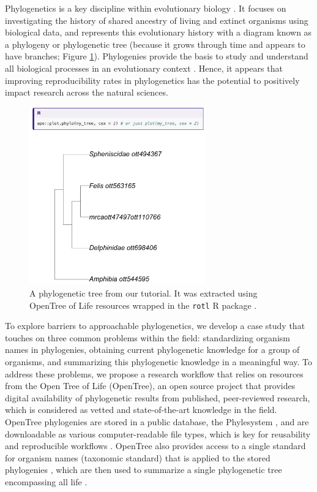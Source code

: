 \documentclass[12pt]{article}
\begin{document}
Phylogenetics is a key discipline within evolutionary biology \citep{dobzhansky1973nothing}.
It focuses on investigating the history of shared ancestry of living and extinct
organisms using biological data,
and represents this evolutionary history with a diagram known as a phylogeny
or phylogenetic tree (because it grows through time and appears to have branches;
Figure \ref{fig:tree}).
Phylogenies provide the basis to study and understand all biological processes
in an evolutionary context \citep{dobzhansky1973nothing}.
Hence, it appears that improving reproducibility rates in phylogenetics has the
potential to positively impact research across the natural sciences.

\begin{figure}
\begin{center}
\includegraphics[width=3in]{fig-tree.png}
\end{center}
\caption{A phylogenetic tree from our tutorial. It was extracted using OpenTree of Life resources \citep{opentreeoflife2019synth} wrapped in the \texttt{rotl} R package \citep{michonneau2016rotl}. \label{fig:tree}}
\end{figure}

To explore barriers to approachable phylogenetics, we develop a case study
that touches on three common problems within the field: standardizing
organism names in phylogenies, obtaining current phylogenetic knowledge for a group of organisms,
and summarizing this phylogenetic knowledge in a meaningful way.
To address these problems, we propose a research workflow that relies on resources from the Open
Tree of Life (OpenTree), an open source project that provides
digital availability of phylogenetic results from published, peer-reviewed research, which
is considered as vetted and state-of-the-art knowledge in the field.
OpenTree phylogenies are stored in a public database, the Phylesystem \citep{mctavish2015phylesystem},
and are downloadable as various computer-readable file types, which is key for reusability
and reproducible workflows \citep{wilson2017good}.
OpenTree also provides access to a single standard for organism names (taxonomic standard)
that is applied to the stored phylogenies \citep{rees2017automated}, which are
then used to summarize a single phylogenetic tree encompassing all life \citep{opentreeoflife2019synth}.
\end{document}
